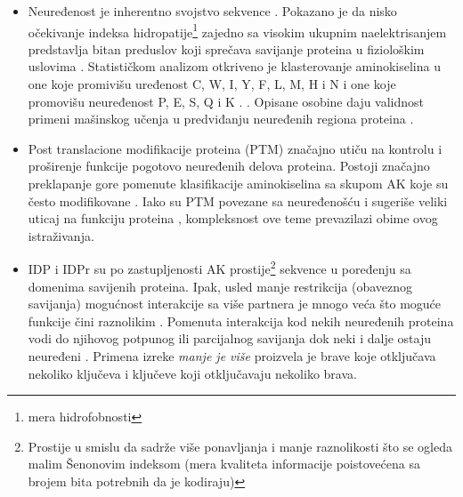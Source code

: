 \begin{itemize}

  \item
    Neuređenost je inherentno svojstvo sekvence \parencite{dunker2001}.
    Pokazano je da nisko očekivanje indeksa hidropatije\footnote{mera hidrofobnosti} zajedno sa visokim
    ukupnim naelektrisanjem predstavlja bitan preduslov koji sprečava savijanje
    proteina u fiziološkim uslovima \parencite{uversky2016}. Statističkom
    analizom otkriveno je klasterovanje aminokiselina u one koje promivišu
    uređenost C, W, I, Y, F, L, M, H i N  i one koje
    promovišu neuređenost P, E, S, Q i K .
    \parencite{uversky2016, oldfield2014}. Opisane osobine daju validnost
    primeni mašinskog učenja u predviđanju neuređenih regiona proteina
    \parencite{oldfield2014}.

  \item
    Post translacione modifikacije proteina (PTM) značajno utiču na  kontrolu i
    proširenje funkcije pogotovo neuređenih delova proteina. Postoji značajno
    preklapanje gore pomenute klasifikacije aminokiselina sa skupom AK koje su
    često modifikovane \parencite{uversky2016}. Iako su PTM povezane sa
    neuređenošću i sugeriše veliki uticaj na funkciju proteina
    \parencite{uversky2016}, kompleksnost ove teme prevazilazi obime ovog
    istraživanja.


  \item
    IDP i IDPr su po zastupljenosti AK prostije\footnote{ Prostije u smislu da
      sadrže više ponavljanja i manje raznolikosti što se ogleda malim Šenonovim indeksom (mera kvaliteta
    informacije poistovećena sa brojem bita potrebnih da je kodiraju) }
    sekvence u poređenju sa domenima savijenih proteina. Ipak, usled manje
    restrikcija (obaveznog savijanja) mogućnost interakcije sa više partnera je
    mnogo veća što moguće funkcije čini raznolikim \parencite{uversky2016}.
    Pomenuta interakcija kod nekih neuređenih proteina vodi do njihovog
    potpunog ili parcijalnog savijanja dok neki i dalje ostaju neuređeni
    \parencite{uversky2016}.  Primena izreke \textit{manje je više} proizvela
    je brave koje otključava nekoliko ključeva i ključeve koji otključavaju
    nekoliko brava.


\end{itemize}
